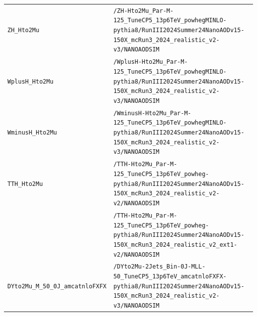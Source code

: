 \begin{longtable}{@{}>{\RaggedRight\arraybackslash}p{} >{\RaggedRight\arraybackslash}p{}@{}}
\addlinespace[2pt]
\texttt{ZH\_\allowbreak{}Hto2Mu} & \texttt{/\allowbreak{}ZH-\allowbreak{}Hto2Mu\_\allowbreak{}Par-\allowbreak{}M-\allowbreak{}125\_\allowbreak{}TuneCP5\_\allowbreak{}13p6TeV\_\allowbreak{}powhegMINLO-\allowbreak{}pythia8/\allowbreak{}RunIII2024Summer24NanoAODv15-\allowbreak{}150X\_\allowbreak{}mcRun3\_\allowbreak{}2024\_\allowbreak{}realistic\_\allowbreak{}v2-\allowbreak{}v3/\allowbreak{}NANOAODSIM} \\
\addlinespace[2pt]
\texttt{WplusH\_\allowbreak{}Hto2Mu} & \texttt{/\allowbreak{}WplusH-\allowbreak{}Hto2Mu\_\allowbreak{}Par-\allowbreak{}M-\allowbreak{}125\_\allowbreak{}TuneCP5\_\allowbreak{}13p6TeV\_\allowbreak{}powhegMINLO-\allowbreak{}pythia8/\allowbreak{}RunIII2024Summer24NanoAODv15-\allowbreak{}150X\_\allowbreak{}mcRun3\_\allowbreak{}2024\_\allowbreak{}realistic\_\allowbreak{}v2-\allowbreak{}v3/\allowbreak{}NANOAODSIM} \\
\addlinespace[2pt]
\texttt{WminusH\_\allowbreak{}Hto2Mu} & \texttt{/\allowbreak{}WminusH-\allowbreak{}Hto2Mu\_\allowbreak{}Par-\allowbreak{}M-\allowbreak{}125\_\allowbreak{}TuneCP5\_\allowbreak{}13p6TeV\_\allowbreak{}powhegMINLO-\allowbreak{}pythia8/\allowbreak{}RunIII2024Summer24NanoAODv15-\allowbreak{}150X\_\allowbreak{}mcRun3\_\allowbreak{}2024\_\allowbreak{}realistic\_\allowbreak{}v2-\allowbreak{}v3/\allowbreak{}NANOAODSIM} \\
\addlinespace[2pt]
\texttt{TTH\_\allowbreak{}Hto2Mu} & \texttt{/\allowbreak{}TTH-\allowbreak{}Hto2Mu\_\allowbreak{}Par-\allowbreak{}M-\allowbreak{}125\_\allowbreak{}TuneCP5\_\allowbreak{}13p6TeV\_\allowbreak{}powheg-\allowbreak{}pythia8/\allowbreak{}RunIII2024Summer24NanoAODv15-\allowbreak{}150X\_\allowbreak{}mcRun3\_\allowbreak{}2024\_\allowbreak{}realistic\_\allowbreak{}v2-\allowbreak{}v2/\allowbreak{}NANOAODSIM} \\
 & \texttt{/\allowbreak{}TTH-\allowbreak{}Hto2Mu\_\allowbreak{}Par-\allowbreak{}M-\allowbreak{}125\_\allowbreak{}TuneCP5\_\allowbreak{}13p6TeV\_\allowbreak{}powheg-\allowbreak{}pythia8/\allowbreak{}RunIII2024Summer24NanoAODv15-\allowbreak{}150X\_\allowbreak{}mcRun3\_\allowbreak{}2024\_\allowbreak{}realistic\_\allowbreak{}v2\_\allowbreak{}ext1-\allowbreak{}v2/\allowbreak{}NANOAODSIM} \\
\addlinespace[2pt]
\texttt{DYto2Mu\_\allowbreak{}M\_\allowbreak{}50\_\allowbreak{}0J\_\allowbreak{}amcatnloFXFX} & \texttt{/\allowbreak{}DYto2Mu-\allowbreak{}2Jets\_\allowbreak{}Bin-\allowbreak{}0J-\allowbreak{}MLL-\allowbreak{}50\_\allowbreak{}TuneCP5\_\allowbreak{}13p6TeV\_\allowbreak{}amcatnloFXFX-\allowbreak{}pythia8/\allowbreak{}RunIII2024Summer24NanoAODv15-\allowbreak{}150X\_\allowbreak{}mcRun3\_\allowbreak{}2024\_\allowbreak{}realistic\_\allowbreak{}v2-\allowbreak{}v3/\allowbreak{}NANOAODSIM} \\

\end{longtable}
